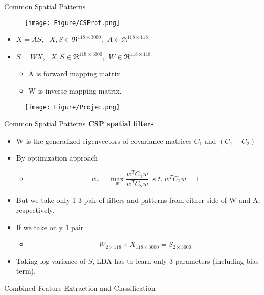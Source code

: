 \documentclass[11pt]{beamer}
\begin{document}
\begin{frame}{Common Spatial Patterns}
\begin{figure}
\texttt{[image: Figure/CSProt.png]}
\end{figure}
\begin{itemize} [ball]
\item $X=AS$,$\;\;\; X,S\in \Re^{118\times 3000}$,$\;\; A\in \Re^{118\times 118} $
\item  $S=WX$,$\;\;\; X,S\in \Re^{118\times 3000}$,$\;\; W\in \Re^{118\times 118} $
 \begin{itemize} [ball]
\item A is forward mapping matrix.
\item W is inverse mapping matrix.
\end{itemize}
  \end{itemize}
  \begin{figure}
 \texttt{[image: Figure/Projec.png]}
 \end{figure}
 \end{frame}
\begin{frame}{Common Spatial Patterns}
\textbf{CSP spatial filters}

\begin{itemize} [ball]
\item W is the generalized eigenvectors of covariance matrices $C_1$ and $\left( C_1 + C_2\right) $
\item By optimization approach
\begin{itemize}  [circle]
\item  \[  w_c= \max_w \frac{w^T C_1 w}{w^T C_2 w}\;\; s.t.\;  w^TC_2 w=1 \]
\end{itemize}
\item But we take only 1-3 pair of filters and patterns from either side of W and A, respectively.
\item If we take only 1 pair
\begin{itemize}  [circle]
\item  \[  W_{2\times 118}\times X_{118\times 3000}=S_{2\times 3000} \]
\end{itemize}
\item Taking log variance of $S$, LDA has to learn only 3 parameters (including bias term). 
  \end{itemize}

 \end{frame}
\begin{frame}
\fontsize{6pt}{7.2}\selectfont
\Large{\centerline{Combined Feature Extraction 
and
 Classification}}
\end{frame}
\end{document}
